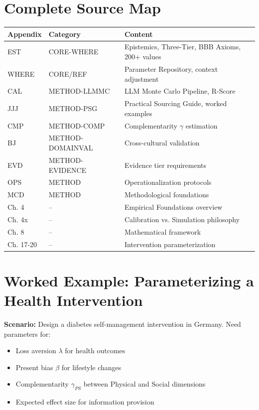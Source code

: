 \section{Complete Source Map}
\label{sec:pm-source-map}

\begin{center}
\begin{tabular}{lll}
\toprule
\textbf{Appendix} & \textbf{Category} & \textbf{Content} \\
\midrule
EST & CORE-WHERE & Epistemics, Three-Tier, BBB Axioms, 200+ values \\
WHERE & CORE/REF & Parameter Repository, context adjustment \\
CAL & METHOD-LLMMC & LLM Monte Carlo Pipeline, R-Score \\
JJJ & METHOD-PSG & Practical Sourcing Guide, worked examples \\
CMP & METHOD-COMP & Complementarity $\gamma$ estimation \\
BJ & METHOD-DOMAINVAL & Cross-cultural validation \\
EVD & METHOD-EVIDENCE & Evidence tier requirements \\
OPS & METHOD & Operationalization protocols \\
MCD & METHOD & Methodological foundations \\
\midrule
Ch. 4 & -- & Empirical Foundations overview \\
Ch. 4x & -- & Calibration vs. Simulation philosophy \\
Ch. 8 & -- & Mathematical framework \\
Ch. 17-20 & -- & Intervention parameterization \\
\bottomrule
\end{tabular}
\end{center}


\section{Worked Example: Parameterizing a Health Intervention}
\label{sec:pm-worked-example}

\textbf{Scenario:} Design a diabetes self-management intervention in Germany. Need parameters for:
\begin{itemize}[nosep]
    \item Loss aversion $\lambda$ for health outcomes
    \item Present bias $\beta$ for lifestyle changes
    \item Complementarity $\gamma_{PS}$ between Physical and Social dimensions
    \item Expected effect size for information provision
\end{itemize}

